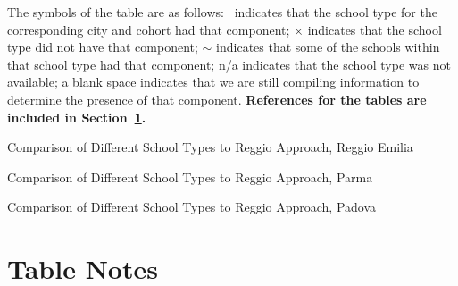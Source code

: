 The symbols of the table are as follows: \checkmark\ indicates that the school type for the corresponding city and cohort had that component; $\times$ indicates that the school type did not have that component; $\sim$ indicates that some of the schools within that school type had that component; n/a indicates that the school type was not available; a blank space indicates that we are still compiling information to determine the presence of that component. \textbf{References for the tables are included in Section~\ref{sec:tabnotes}.}


\begin{table}[htb]
\centering
\scriptsize
\caption{Comparison of Different School Types to Reggio Approach, Reggio Emilia}\label{table:comparisonRE}
	
\end{table}

\begin{table}[htb]
\centering
\scriptsize
\caption{Comparison of Different School Types to Reggio Approach, Parma}\label{table:comparisonPar}
\scalebox{0.8}{
	
}
\end{table}
\restoregeometry

\begin{table}[H]
\centering
\scriptsize
\caption{Comparison of Different School Types to Reggio Approach, Padova}\label{table:comparisonPad}
	
\end{table}


\section{Table Notes}\label{sec:tabnotes}

